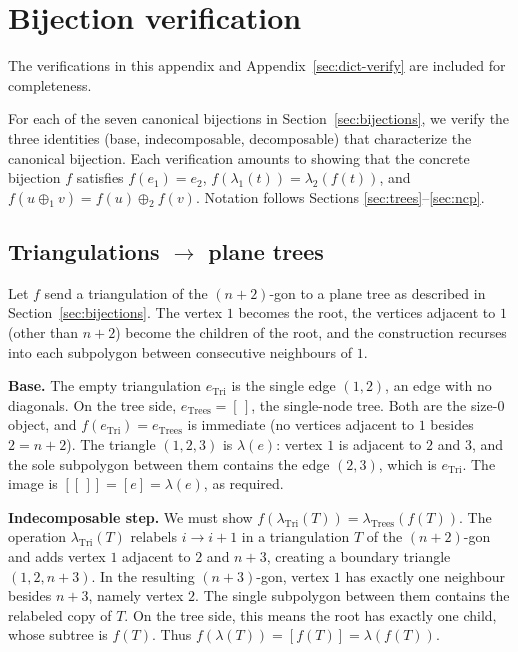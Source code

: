 \documentclass[a4paper,11pt]{article}
\theoremstyle{definition}
\begin{document}
\appendix

\section{Bijection verification}\label{sec:bij-verify}

The verifications in this appendix and
Appendix~\ref{sec:dict-verify} are included for
completeness.

For each of the seven canonical bijections in
Section~\ref{sec:bijections}, we verify the three identities
(base, indecomposable, decomposable) that characterize the
canonical bijection. Each verification amounts to showing
that the concrete bijection $f$ satisfies
$f(e_1) = e_2$,
$f(\lambda_1(t)) = \lambda_2(f(t))$, and
$f(u \oplus_1 v) = f(u) \oplus_2 f(v)$.
Notation follows Sections \ref{sec:trees}--\ref{sec:ncp}.

\subsection{Triangulations $\to$ plane trees}\label{sec:bij-tri-trees}

Let $f$ send a triangulation of the $(n{+}2)$-gon to a
plane tree as described in Section~\ref{sec:bijections}. The vertex $1$
becomes the root, the vertices adjacent to $1$ (other than
$n{+}2$) become the children of the root, and the
construction recurses into each subpolygon between consecutive
neighbours of $1$.

\textbf{Base.}
The empty triangulation $e_{\text{Tri}}$ is the single
edge $(1,2)$, an edge with no diagonals. On the tree
side, $e_{\text{Trees}} = [\,]$, the single-node tree.
Both are the size-$0$ object, and
$f(e_{\text{Tri}}) = e_{\text{Trees}}$ is immediate (no
vertices adjacent to $1$ besides $2 = n{+}2$). The
triangle $(1,2,3)$ is $\lambda(e)$: vertex $1$ is
adjacent to $2$ and $3$, and the sole subpolygon between them
contains the edge $(2,3)$, which is $e_{\text{Tri}}$. The
image is $[[\,]] = [e] = \lambda(e)$, as required.

\textbf{Indecomposable step.}
We must show
$f(\lambda_{\text{Tri}}(T))
= \lambda_{\text{Trees}}(f(T))$.
The operation $\lambda_{\text{Tri}}(T)$ relabels
$i \to i{+}1$ in a triangulation $T$ of the
$(n{+}2)$-gon and adds vertex $1$ adjacent to $2$ and
$n{+}3$, creating a boundary triangle $(1, 2, n{+}3)$.
In the resulting $(n{+}3)$-gon, vertex $1$ has exactly
one neighbour besides $n{+}3$, namely vertex $2$. The
single subpolygon between them contains the relabeled copy
of $T$. On the tree side, this means the root has exactly
one child, whose subtree is $f(T)$. Thus
$f(\lambda(T)) = [f(T)] = \lambda(f(T))$.
\end{document}
